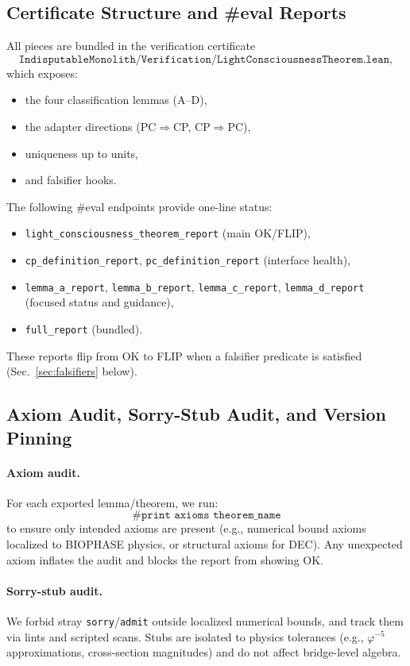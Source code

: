 \documentclass[12pt,a4paper]{article}
\begin{document}
\subsection{Certificate Structure and \#eval Reports}
All pieces are bundled in the verification certificate
\[
  \texttt{IndisputableMonolith/Verification/LightConsciousnessTheorem.lean},
\]
which exposes:
\begin{itemize}
  \item the four classification lemmas (A--D),
  \item the adapter directions (PC\(\Rightarrow\)CP, CP\(\Rightarrow\)PC),
  \item uniqueness up to units,
  \item and falsifier hooks.
\end{itemize}
The following \#eval endpoints provide one-line status:
\begin{itemize}
  \item \texttt{light\_consciousness\_theorem\_report} (main OK/FLIP),
  \item \texttt{cp\_definition\_report}, \texttt{pc\_definition\_report} (interface health),
  \item \texttt{lemma\_a\_report}, \texttt{lemma\_b\_report}, \texttt{lemma\_c\_report}, \texttt{lemma\_d\_report} (focused status and guidance),
  \item \texttt{full\_report} (bundled).
\end{itemize}
These reports flip from OK to FLIP when a falsifier predicate is satisfied (Sec.~\ref{sec:falsifiers} below).

\subsection{Axiom Audit, Sorry-Stub Audit, and Version Pinning}
\paragraph{Axiom audit.}
For each exported lemma/theorem, we run:
\[
  \texttt{\#print axioms\ theorem\_name}
\]
to ensure only intended axioms are present (e.g., numerical bound axioms localized to BIOPHASE physics, or structural axioms for DEC). Any unexpected axiom inflates the audit and blocks the report from showing OK.

\paragraph{Sorry-stub audit.}
We forbid stray \texttt{sorry}/\texttt{admit} outside localized numerical bounds, and track them via lints and scripted scans. Stubs are isolated to physics tolerances (e.g., \(\varphi^{-5}\) approximations, cross-section magnitudes) and do not affect bridge-level algebra.
\end{document}
